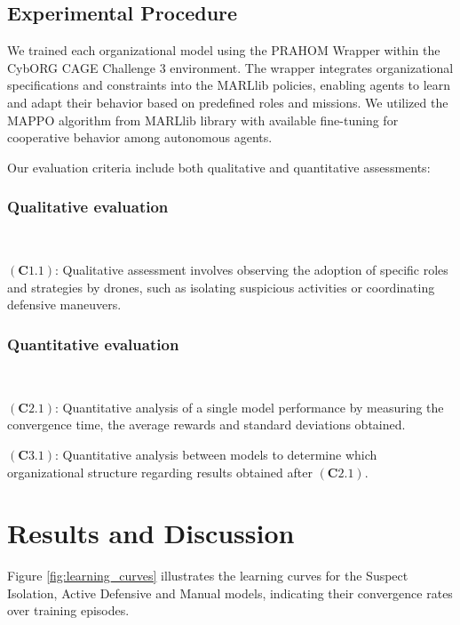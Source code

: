 \documentclass[conference]{IEEEtran}
\begin{document}
\subsection{Experimental Procedure}

We trained each organizational model using the PRAHOM Wrapper within the CybORG CAGE Challenge 3 environment. The wrapper integrates organizational specifications and constraints into the MARLlib policies, enabling agents to learn and adapt their behavior based on predefined roles and missions. We utilized the MAPPO algorithm from MARLlib library with available fine-tuning for cooperative behavior among autonomous agents.

Our evaluation criteria include both qualitative and quantitative assessments:

\subsubsection{Qualitative evaluation}

\

$(\mathbf{C1.1})$: \quad Qualitative assessment involves observing the adoption of specific roles and strategies by drones, such as isolating suspicious activities or coordinating defensive maneuvers.

\subsubsection{Quantitative evaluation}

\

$(\mathbf{C2.1})$: \quad Quantitative analysis of a single model performance by measuring the convergence time, the average rewards and standard deviations obtained.\

$(\mathbf{C3.1})$: \quad Quantitative analysis between  models to determine which organizational structure regarding results obtained after $(\mathbf{C2.1})$.



\section{Results and Discussion}\label{sec:results_and_discussion}

Figure \ref{fig:learning_curves} illustrates the learning curves for the Suspect Isolation, Active Defensive and Manual models, indicating their convergence rates over training episodes.
\end{document}
